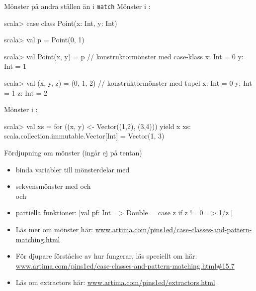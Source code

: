 \begin{Slide}{Mönster på andra ställen än i \texttt{match}}\SlideFontSmall
Mönster i :
\vspace{-0.25em}\begin{REPL}
scala> case class Point(x: Int, y: Int)

scala> val p = Point(0, 1)

scala> val Point(x, y) = p          // konstruktormönster med case-klass
x: Int = 0
y: Int = 1

scala> val (x, y, z) = (0, 1, 2)    // konstruktormönster med tupel
x: Int = 0
y: Int = 1
z: Int = 2

\end{REPL}
Mönster i :
\vspace{-0.25em}\begin{REPL}
scala> val xs = for ((x, y) <- Vector((1,2), (3,4))) yield x
xs: scala.collection.immutable.Vector[Int] = Vector(1, 3)
\end{REPL}
\end{Slide}

\begin{Slide}{Fördjupning om mönster (ingår ej på tentan)}\SlideFontSmall
\begin{itemize}
\item binda variabler till mönsterdelar med  \\

\item sekvensmönster med \code{_} och \code{_*} \\  och 

\item partiella funktioner: \code|val pf: Int => Double = { case z if z != 0 => 1/z }|

\item Läs mer om mönster här:  \href{http://www.artima.com/pins1ed/case-classes-and-pattern-matching.html}{\SlideFontTiny www.artima.com/pins1ed/case-classes-and-pattern-matching.html}

\item För djupare förståelse av hur  fungerar, läs speciellt om  här: \href{http://www.artima.com/pins1ed/case-classes-and-pattern-matching.html\#15.7}{\SlideFontTiny www.artima.com/pins1ed/case-classes-and-pattern-matching.html\#15.7}

\item Läs om extractors här: \href{http://www.artima.com/pins1ed/extractors.html}{\SlideFontTiny www.artima.com/pins1ed/extractors.html}

\end{itemize}
\end{Slide}


